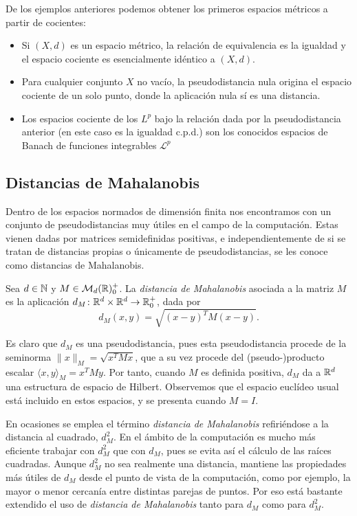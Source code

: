 De los ejemplos anteriores podemos obtener los primeros espacios métricos a partir de cocientes:

\begin{itemize}
    \item Si $(X,d)$ es un espacio métrico, la relación de equivalencia es la igualdad y el espacio cociente es esencialmente idéntico a $(X,d)$.
    \item Para cualquier conjunto $X$ no vacío, la pseudodistancia nula origina el espacio cociente de un solo punto, donde la aplicación nula sí es una distancia.
    \item Los espacios cociente de los $L^p$ bajo la relación dada por la pseudodistancia anterior (en este caso es la igualdad c.p.d.) son los conocidos espacios de Banach de funciones integrables $\mathcal{L}^p$
\end{itemize}

\subsection{Distancias de Mahalanobis}

Dentro de los espacios normados de dimensión finita nos encontramos con un conjunto de pseudodistancias muy útiles en el campo de la computación. Estas vienen dadas por matrices semidefinidas positivas, e independientemente de si se tratan de distancias propias o únicamente de pseudodistancias, se les conoce como distancias de Mahalanobis.

\begin{definition}
    Sea $d \in \mathbb{N}$ y $M \in \mathcal{M}_d(\mathbb{R})^+_0$. La \emph{distancia de Mahalanobis} asociada a la matriz $M$ es la aplicación $d_M \colon \mathbb{R}^d \times \mathbb{R}^d \to \mathbb{R}^+_0$, dada por
    \[d_M(x,y) = \sqrt{(x-y)^TM(x-y)}. \]
\end{definition}

Es claro que $d_M$ es una pseudodistancia, pues esta pseudodistancia procede de la seminorma $\|x\|_M = \sqrt{x^TMx}$, que a su vez procede del (pseudo-)producto escalar $\langle x, y \rangle_M = x^TMy$. Por tanto, cuando $M$ es definida positiva, $d_M$ da a $\mathbb{R}^d$ una estructura de espacio de Hilbert. Observemos que el espacio euclídeo usual está incluido en estos espacios, y se presenta cuando $M = I$.

En ocasiones se emplea el término \emph{distancia de Mahalanobis} refiriéndose a la distancia al cuadrado, $d_M^2$. En el ámbito de la computación es mucho más eficiente trabajar con $d_M^2$ que con $d_M$, pues se evita así el cálculo de las raíces cuadradas. Aunque $d_M^2$ no sea realmente una distancia, mantiene las propiedades más útiles de $d_M$ desde el punto de vista de la computación, como por ejemplo, la mayor o menor cercanía entre distintas parejas de puntos. Por eso está bastante extendido el uso de \emph{distancia de Mahalanobis} tanto para $d_M$ como para $d_M^2$.

